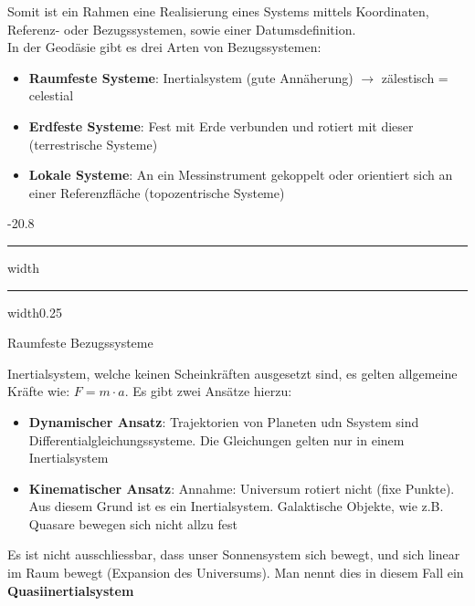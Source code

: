 \documentclass[9pt, landscape, fleqn]{scrartcl}
\makeatletter
\renewcommand{\subsection}{\@startsection{subsection}{1}{0mm}%
{-2\baselineskip}{0.8\baselineskip}%
{\hrule depth 0.2pt width\columnwidth\hrule depth0.75pt
width0.25\columnwidth\vspace*{1.2em}\large\bfseries\rmfamily}}
\makeatother
\begin{document}
\begin{multicols*}{3}
Somit ist ein Rahmen eine Realisierung eines Systems mittels Koordinaten, Referenz- oder Bezugssystemen, sowie einer Datumsdefinition. \\

In der Geodäsie gibt es drei Arten von Bezugssystemen:

\begin{itemize}
    \item \textbf{Raumfeste Systeme}: Inertialsystem (gute Annäherung) $\rightarrow$ zälestisch = celestial
    \item \textbf{Erdfeste Systeme}: Fest mit Erde verbunden und rotiert mit dieser (terrestrische Systeme)
    \item \textbf{Lokale Systeme}: An ein Messinstrument gekoppelt oder orientiert sich an einer Referenzfläche (topozentrische Systeme)
\end{itemize}

\subsection{Raumfeste Bezugssysteme}

Inertialsystem, welche keinen Scheinkräften ausgesetzt sind, es gelten allgemeine Kräfte wie: $F = m\cdot a$. Es gibt zwei Ansätze hierzu:

\begin{itemize}
    \item \textbf{Dynamischer Ansatz}: Trajektorien von Planeten udn Ssystem sind Differentialgleichungssysteme. Die Gleichungen gelten nur in einem Inertialsystem
    \item \textbf{Kinematischer Ansatz}: Annahme: Universum rotiert nicht (fixe Punkte). Aus diesem Grund ist es ein Inertialsystem. Galaktische Objekte, wie z.B. Quasare bewegen sich nicht allzu fest
\end{itemize}

Es ist nicht ausschliessbar, dass unser Sonnensystem sich bewegt, und sich linear im Raum bewegt (Expansion des Universums). Man nennt dies in diesem Fall ein \textbf{Quasiinertialsystem}


\end{multicols*}
\end{document}
